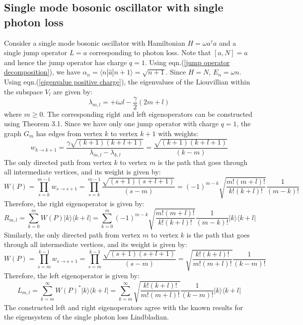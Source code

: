 \documentclass[11pt,a4paper]{article}
\begin{document}
\subsection{Single mode bosonic oscillator with single photon loss}
Consider a single mode bosonic oscillator with Hamiltonian $H = \omega a^{\dagger} a$ and a single jump operator $L = a$ corresponding to photon loss. 
Note that $[a , N] = a$ and hence the jump operator has charge $q = 1$. Using eqn.(\ref{jump operator decomposition}), we have $\alpha_{n} = \langle n | \hat{a} | n+1 \rangle = \sqrt{n+1}$.
Since $H = N$, $E_n = \omega n$. Using eqn.(\ref{eigenvalue positive charge}), the eigenvalues of the Liouvillian within the subspace $V_l$ are given by:
\begin{equation}
    \lambda_{m,l} = +i \omega l - \frac{\gamma}{2} (2 m + l)
\end{equation}
where $m \geq 0$. The corresponding right and left eigenoperators can be constructed using Theorem 3.1. 
Since we have only one jump operator with charge $q=1$, the graph $G_m$ has edges from vertex $k$ to vertex $k+1$ with weights:
\begin{equation}
    w_{k \to k+1} = \frac{\gamma \sqrt{(k+1)(k+l+1)}}{\lambda_{m,l} - \lambda_{k,l}} = \frac{ \sqrt{(k+1)(k+l+1)}}{  (k - m)}
\end{equation}
The only directed path from vertex $k$ to vertex $m$ is the path that goes through all intermediate vertices, and its weight is given by:
\begin{equation}
    W(P) = \prod_{s=k}^{m-1} w_{s \to s+1} = \prod_{s=k}^{m-1} \frac{ \sqrt{(s+1)(s+l+1)}}{  (s - m)} = (-1)^{m-k} \sqrt{\frac{m! (m+l)!}{k! (k+l)!}} \frac{1}{(m-k)!}
\end{equation}
Therefore, the right eigenoperator is given by:
\begin{equation}
    R_{m,l} = \sum_{k=0}^{m} W(P) |k\rangle \langle k+l| = \sum_{k=0}^{m} (-1)^{m-k} \sqrt{\frac{m! (m+l)!}{k! (k+l)!}} \frac{1}{(m-k)!} |k\rangle \langle k+l|
\end{equation}
Similarly, the only directed path from vertex $m$ to vertex $k$ is the path that goes through all intermediate vertices, and its weight is given by:  
\begin{equation}
    W(P) = \prod_{s=m}^{k-1} w_{s \to s+1} = \prod_{s=m}^{k-1} \frac{ \sqrt{(s+1)(s+l+1)}}{  (s - m)} = \sqrt{\frac{k! (k+l)!}{m! (m+l)!}} \frac{1}{(k-m)!}
\end{equation}
Therefore, the left eigenoperator is given by:
\begin{equation}
    L_{m,l} = \sum_{k=m}^{\infty} W(P)^* |k\rangle \langle k+l| = \sum_{k=m}^{\infty} \sqrt{\frac{k! (k+l)!}{m! (m+l)!}} \frac{1}{(k-m)!} |k\rangle \langle k+l|
\end{equation}
The constructed left and right eigenoperators agree with the known results for the eigensystem of the single photon loss Lindbladian.





\end{document}
